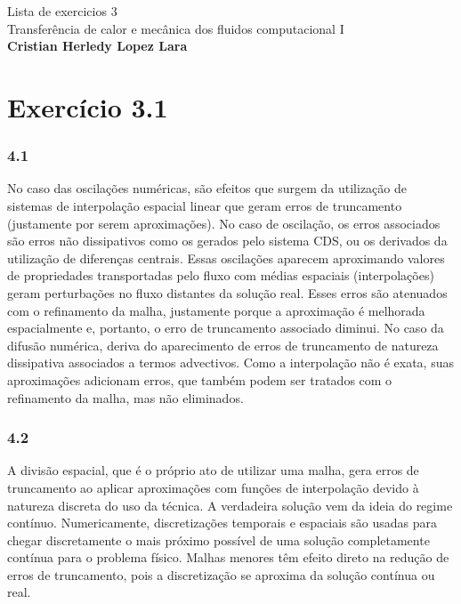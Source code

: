 \documentclass[]{article}
\title{}
\author{}
\begin{document}
\begin{center}
	{\tiny {\normalsize {\large Lista de exercicios 3\\
Transferência de calor e mecânica dos fluidos computacional I\\
\textbf{Cristian Herledy Lopez Lara}}}}
\end{center}

\section*{Exercício 3.1}
\subsubsection*{4.1}

No caso das oscilações numéricas, são efeitos que surgem da utilização de sistemas de interpolação espacial linear que geram erros de truncamento (justamente por serem aproximações). No caso de oscilação, os erros associados são erros não dissipativos como os gerados pelo sistema CDS, ou os derivados da utilização de diferenças centrais. Essas oscilações aparecem aproximando valores de propriedades transportadas pelo fluxo com médias espaciais (interpolações) geram perturbações no fluxo distantes da solução real. Esses erros são atenuados com o refinamento da malha, justamente porque a aproximação é melhorada espacialmente e, portanto, o erro de truncamento associado diminui. No caso da difusão numérica, deriva do aparecimento de erros de truncamento de natureza dissipativa associados a termos advectivos. Como a interpolação não é exata, suas aproximações adicionam erros, que também podem ser tratados com o refinamento da malha, mas não eliminados.\\

\subsubsection*{4.2}

A divisão espacial, que é o próprio ato de utilizar uma malha, gera erros de truncamento ao aplicar aproximações com funções de interpolação devido à natureza discreta do uso da técnica. A verdadeira solução vem da ideia do regime contínuo. Numericamente, discretizações temporais e espaciais são usadas para chegar discretamente o mais próximo possível de uma solução completamente contínua para o problema físico. Malhas menores têm efeito direto na redução de erros de truncamento, pois a discretização se aproxima da solução contínua ou real.
\end{document}
